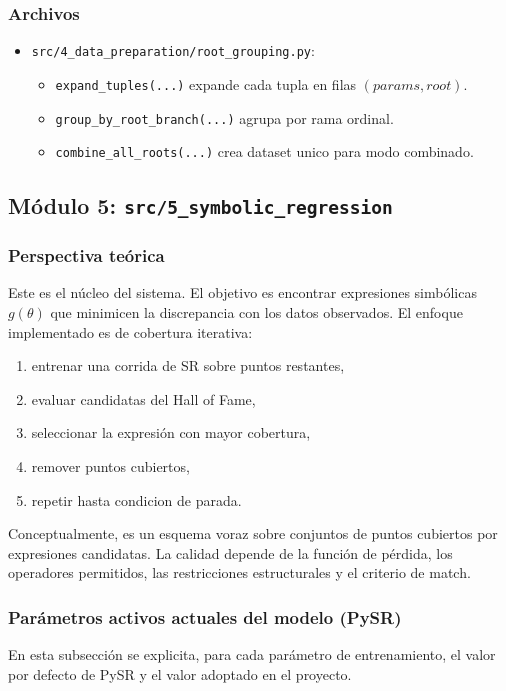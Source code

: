 \documentclass[12pt]{article}
\begin{document}
\subsubsection*{Archivos}
\begin{itemize}[leftmargin=1.5em]
    \item \texttt{src/4\_data\_preparation/root\_grouping.py}:
    \begin{itemize}[leftmargin=1.5em]
        \item \texttt{expand\_tuples(...)} expande cada tupla en filas \((params, root)\).
        \item \texttt{group\_by\_root\_branch(...)} agrupa por rama ordinal.
        \item \texttt{combine\_all\_roots(...)} crea dataset unico para modo combinado.
    \end{itemize}
\end{itemize}

\subsection{Módulo 5: \texttt{src/5\_symbolic\_regression}}
\subsubsection*{Perspectiva teórica}
Este es el núcleo del sistema. El objetivo es encontrar expresiones simbólicas $g(\theta)$ que minimicen la discrepancia con los datos observados. El enfoque implementado es de cobertura iterativa:
\begin{enumerate}[leftmargin=1.5em]
    \item entrenar una corrida de SR sobre puntos restantes,
    \item evaluar candidatas del Hall of Fame,
    \item seleccionar la expresión con mayor cobertura,
    \item remover puntos cubiertos,
    \item repetir hasta condicion de parada.
\end{enumerate}

Conceptualmente, es un esquema voraz sobre conjuntos de puntos cubiertos por expresiones candidatas. La calidad depende de la función de pérdida, los operadores permitidos, las restricciones estructurales y el criterio de match.

\subsubsection*{Parámetros activos actuales del modelo (PySR)}
En esta subsección se explicita, para cada parámetro de entrenamiento, el valor por defecto de PySR y el valor adoptado en el proyecto.
\end{document}
